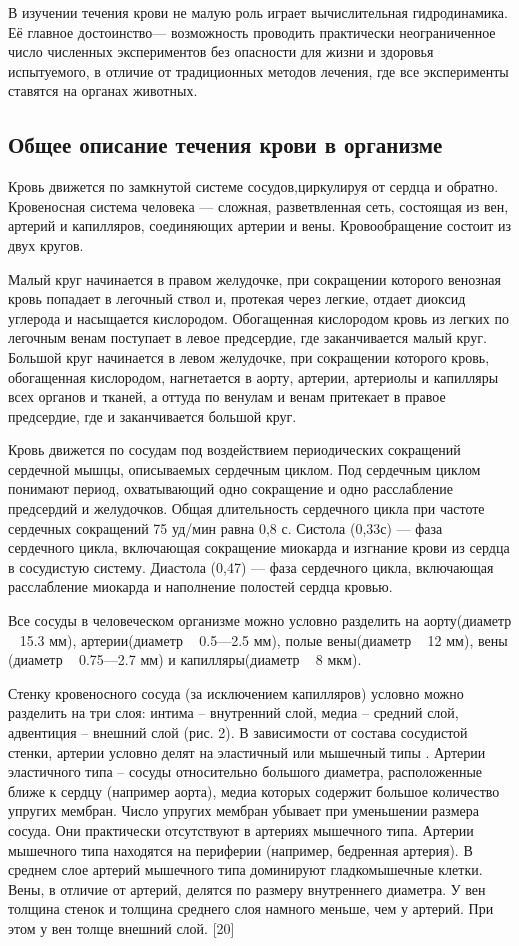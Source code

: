 \documentclass[a4paper, 14pt]{article}
\begin{document}
В изучении течения крови не малую роль играет вычислительная гидродинамика. Её главное достоинство— возможность проводить практически неограниченное число численных экспериментов без опасности для жизни и здоровья испытуемого, в отличие от традиционных методов лечения, где все эксперименты ставятся на органах животных.

\subsection{Общее описание течения крови в организме}
Кровь движется по замкнутой системе сосудов,циркулируя от сердца и обратно. Кровеносная система человека — сложная, разветвленная сеть, состоящая из вен, артерий и капилляров, соединяющих артерии и вены. Кровообращение состоит из двух кругов.

Малый круг начинается в правом желудочке, при сокращении которого венозная кровь попадает в легочный ствол и, протекая через легкие, отдает диоксид углерода и насыщается кислородом. Обогащенная кислородом кровь из легких по легочным венам поступает в левое предсердие, где заканчивается малый круг. Большой круг начинается в левом желудочке, при сокращении которого кровь, обогащенная кислородом, нагнетается в аорту, артерии, артериолы и капилляры всех органов и тканей, а оттуда по венулам и венам притекает в правое предсердие, где и заканчивается большой круг.

Кровь движется по сосудам под воздействием периодических сокращений сердечной мышцы, описываемых сердечным циклом. Под сердечным циклом понимают период, охватывающий одно сокращение и одно расслабление предсердий и желудочков. Общая длительность сердечного цикла при частоте сердечных сокращений 75 уд/мин равна 0,8 с. Систола (0,33с) — фаза сердечного цикла, включающая сокращение миокарда и изгнание крови из сердца в сосудистую систему. Диастола (0,47) — фаза сердечного цикла, включающая расслабление миокарда и наполнение полостей сердца кровью.

Все сосуды в человеческом организме можно условно разделить на аорту(диаметр ~ 15.3 мм), артерии(диаметр ~ 0.5—2.5 мм), полые вены(диаметр ~ 12 мм), вены (диаметр ~ 0.75—2.7 мм) и капилляры(диаметр ~ 8 мкм).

Стенку кровеносного сосуда (за исключением капилляров) условно можно разделить на три слоя: интима – внутренний слой, медиа – средний слой, адвентиция – внешний слой (рис. 2).
В зависимости от состава сосудистой стенки, артерии условно делят на эластичный или мышечный типы . Артерии эластичного типа – сосуды относительно большого диаметра, расположенные ближе к сердцу (например аорта), медиа которых содержит большое количество упругих мембран. Число упругих мембран убывает при уменьшении размера сосуда. Они практически отсутствуют в артериях мышечного типа. Артерии мышечного типа находятся на периферии (например, бедренная артерия). В среднем слое артерий мышечного типа доминируют гладкомышечные клетки. Вены, в отличие от артерий, делятся по размеру внутреннего диаметра. У вен толщина стенок и толщина среднего слоя намного меньше, чем у артерий. При этом у вен толще внешний слой. [20] 
\end{document}
